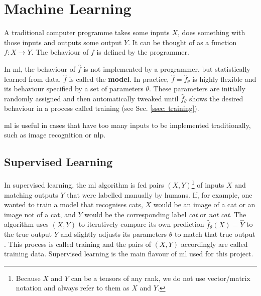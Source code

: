 \section{Machine Learning \label{sec: ML}}
    A traditional computer programme takes some inputs $X$, does something with those inputs and outputs some output $Y$. It can be thought of as a function $f: X \rightarrow Y$. The behaviour of $f$ is defined by the programmer.

    In \gls{ml}, the behaviour of $\hat{f}$ is not implemented by a programmer, but statistically learned from data. $\hat{f}$ is called the \textbf{\gls{model}}. In practice, $\hat{f} = \hat{f}_\theta$ is highly flexible and its behaviour specified by a set of parameters $\theta$. These parameters are initially randomly assigned and then automatically tweaked until $\hat{f}_\theta$ shows the desired behaviour in a process called training (see Sec. \ref{ssec: training})\cite{mlTextbook}.

    \gls{ml} is useful in cases that have too many inputs to be implemented traditionally, such as image recognition or \gls{nlp}.

    \subsection{Supervised Learning}
        In supervised learning, the \gls{ml} algorithm is fed pairs $(X, Y)$\footnote{Because $X$ and $Y$ can be a tensors of any rank, we do not use vector/matrix notation and always refer to them as $X$ and $Y$.} of inputs $X$ and matching outputs $Y$ that were labelled manually by humans. If, for example, one wanted to train a \gls{model} that recognises cats, $X$ would be an image of a cat or an image not of a cat, and $Y$ would be the corresponding label \textit{cat} or \textit{not cat}. The algorithm uses $(X, Y)$ to iteratively compare its own prediction $\hat{f}_\theta(X) = \hat{Y}$ to the true output $Y$ and slightly adjusts its parameters $\theta$ to match that true output
        .
        This process is called training and the pairs of $(X, Y)$ accordingly are called training data. %
        Supervised learning is the main flavour of \gls{ml} used for this project.

